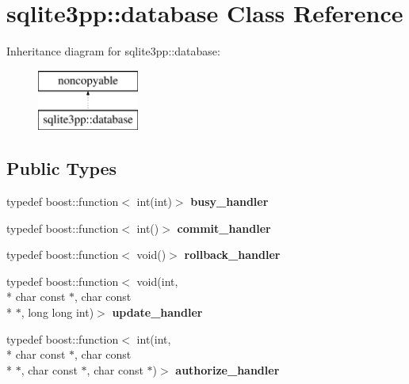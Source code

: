 \hypertarget{classsqlite3pp_1_1database}{\section{sqlite3pp\-:\-:database Class Reference}
\label{classsqlite3pp_1_1database}
}
Inheritance diagram for sqlite3pp\-:\-:database\-:\begin{figure}[H]
\begin{center}
\leavevmode
\includegraphics[height=2.000000cm]{classsqlite3pp_1_1database}
\end{center}
\end{figure}
\subsection*{Public Types}
\begin{DoxyCompactItemize}
\item 
\hypertarget{classsqlite3pp_1_1database_a00e316167d2a96f2458372e12e7dc9ac}{typedef boost\-::function$<$ int(int)$>$ {\bfseries busy\-\_\-handler}}\label{classsqlite3pp_1_1database_a00e316167d2a96f2458372e12e7dc9ac}

\item 
\hypertarget{classsqlite3pp_1_1database_ab813e24d10edc9c24102b3f2459be6a2}{typedef boost\-::function$<$ int()$>$ {\bfseries commit\-\_\-handler}}\label{classsqlite3pp_1_1database_ab813e24d10edc9c24102b3f2459be6a2}

\item 
\hypertarget{classsqlite3pp_1_1database_a307b494852597cbe1baaef1197c1ecb4}{typedef boost\-::function$<$ void()$>$ {\bfseries rollback\-\_\-handler}}\label{classsqlite3pp_1_1database_a307b494852597cbe1baaef1197c1ecb4}

\item 
\hypertarget{classsqlite3pp_1_1database_a86dc0ab97b10669c75e7b35480e8666a}{typedef boost\-::function$<$ void(int, \\*
char const $\ast$, char const \\*
$\ast$, long long int)$>$ {\bfseries update\-\_\-handler}}\label{classsqlite3pp_1_1database_a86dc0ab97b10669c75e7b35480e8666a}

\item 
\hypertarget{classsqlite3pp_1_1database_a29502faa9cba0fd03cf08d8815fc714e}{typedef boost\-::function$<$ int(int, \\*
char const $\ast$, char const \\*
$\ast$, char const $\ast$, char const $\ast$)$>$ {\bfseries authorize\-\_\-handler}}\label{classsqlite3pp_1_1database_a29502faa9cba0fd03cf08d8815fc714e}

\end{DoxyCompactItemize}
